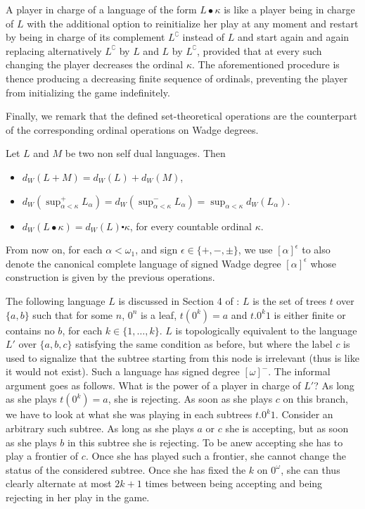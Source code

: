 A player in  charge of a language of the form $L\bullet \kappa$ is like a player being in charge of $L$ with the additional option to reinitialize her play at any moment and restart by being 
in charge of its complement $L^\complement$ instead of $L$ and start again and again replacing alternatively $L^\complement$ by $L$ and  $L$ by 
$L^\complement$,  provided that at every such changing the player decreases the ordinal $\kappa$.  The aforementioned procedure is thence producing a decreasing finite sequence of ordinals, preventing the player from initializing the game indefinitely.


Finally, we remark that  the defined set-theoretical operations are the counterpart of the corresponding ordinal operations on Wadge degrees.

\begin{lemma}
\label{r_mult}
Let $L$ and $ M$ be two non self dual languages. Then 
\begin{itemize}
\item $d_W(L+M)=d_W(L)+d_W(M)$, 
\item$d_W(\sup^+ _{\alpha < \kappa} L_\alpha)= d_W(\sup^- _{\alpha < \kappa} L_\alpha)=\sup_{\alpha < \kappa}d_W( L_\alpha)$.
\item $d_W(L \bullet \kappa)= d_W(L) \centerdot \kappa$, for every countable ordinal $\kappa$.
\end{itemize}
\end{lemma}




From now on, for each $\alpha < \omega_1$, and sign $\epsilon \in \{+,-,\pm\}$, we use  $[\alpha]^\epsilon$ to also denote the canonical complete language of signed Wadge degree $[\alpha]^\epsilon$ whose construction is given by the previous operations.

\begin{remark}\label{rem:example}
The following language $L$ is discussed in Section 4 of  \cite{bp}: $L$ is the set of trees $t$ over $\{a,b\}$ such that for some $n$, $0^n$ is a leaf, $t(0^k)=a$ and $t.0^k1$ is either finite or contains no $b$, for each $k\in \{1, \dots, k\}$. $L$ is topologically equivalent to the language  $L'$ over $\{a, b, c\}$ satisfying the same condition as before, but where the label $c$ is used to signalize that the subtree starting from this node is irrelevant (thus is like it would not exist). Such a language has signed degree $[\omega]^-$. The informal argument goes as follows. What is the power of a player in charge of $L'$? As long as she plays $t(0^k)=a$, she is rejecting. 
As soon as she plays $c$ on this branch, we have to look at what she was playing in each subtrees  $t.0^k1$. Consider an arbitrary such subtree. As long as she plays $a$ or $c$ she is accepting, but as soon as she plays $b$ in this subtree she is rejecting. To be anew accepting she has to play a frontier of $c$. Once she has played such a frontier, she cannot change the status of the considered subtree. Once she has fixed the $k$ on $0^\omega$, she can thus clearly alternate at most $2k+1$ times between being accepting and being rejecting in her play in the  game. 
\end{remark}


